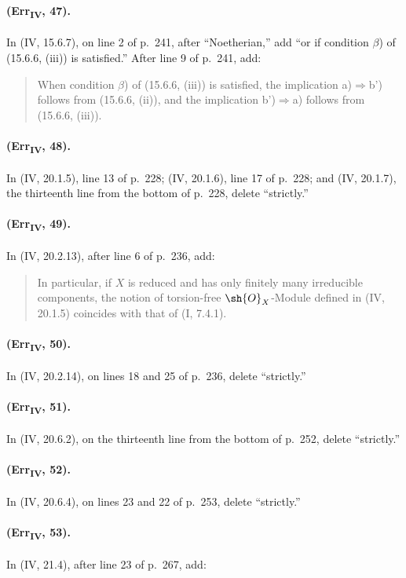 {\paragraph{(Err\textsubscript{IV}, 47).}
In (IV, 15.6.7), on line 2 of p.~241, after ``Noetherian,'' add ``or if
condition $\beta$) of (15.6.6, (iii)) is satisfied.''  After line 9 of
p.~241, add:
\begin{quote}
When condition $\beta$) of (15.6.6, (iii)) is satisfied, the implication
a)$\Rightarrow$b') follows from (15.6.6, (ii)), and the implication
b')$\Rightarrow$a) follows from (15.6.6, (iii)).
\end{quote}

\paragraph{(Err\textsubscript{IV}, 48).}
In (IV, 20.1.5), line 13 of p.~228; (IV, 20.1.6), line 17 of p.~228;
and (IV, 20.1.7), the thirteenth line from the bottom of p.~228, delete
``strictly.''

\paragraph{(Err\textsubscript{IV}, 49).}
In (IV, 20.2.13), after line 6 of p.~236, add:
\begin{quote}
In particular, if $X$ is reduced and has only finitely many irreducible
components, the notion of torsion-free $\sh{O}_X$-Module defined in
(IV, 20.1.5) coincides with that of (I, 7.4.1).
\end{quote}

\paragraph{(Err\textsubscript{IV}, 50).}
In (IV, 20.2.14), on lines 18 and 25 of p.~236, delete ``strictly.''

\paragraph{(Err\textsubscript{IV}, 51).}
In (IV, 20.6.2), on the thirteenth line from the bottom of p.~252,
delete ``strictly.''

\paragraph{(Err\textsubscript{IV}, 52).}
In (IV, 20.6.4), on lines 23 and 22 of p.~253, delete ``strictly.''

\paragraph{(Err\textsubscript{IV}, 53).}
In (IV, 21.4), after line 23 of p.~267, add:

\def\EGAIVSuppressErratumLabels{1}

\let\EGAIVSuppressErratumLabels\undefined
}

